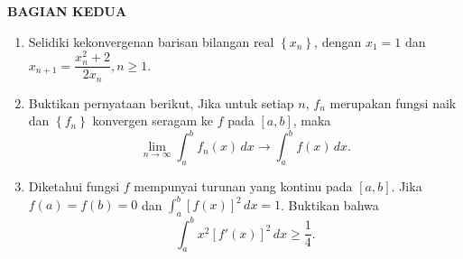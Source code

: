 \documentclass[12pt,twoside]{article}
\begin{document}
\newpage \textbf{BAGIAN KEDUA}
\begin{enumerate}
	\item Selidiki kekonvergenan barisan bilangan real $\left\lbrace x_n \right\rbrace$, dengan $x_1 = 1$ dan $x_{n+1} = \dfrac{x^2_n + 2}{2x_n}, n \geq 1.$

	\item Buktikan pernyataan berikut, Jika untuk setiap $n$, $f_n$ merupakan fungsi naik dan $\left\lbrace f_n \right\rbrace$ konvergen seragam ke $f$ pada $[a,b]$, maka
	      \begin{equation*}
		      \displaystyle\lim_{n \to \infty} \int_{a}^{b} f_n(x)\,dx \to \int_{a}^{b} f(x)\,dx.
	      \end{equation*}

	\item Diketahui fungsi $f$ mempunyai turunan yang kontinu pada $[a,b]$. Jika $f(a)=f(b)=0$ dan $\int_{a}^{b} \left[f(x)\right]^2\,dx = 1$. Buktikan bahwa
	      \begin{equation*}
		      \displaystyle\int_{a}^{b} x^2 [f'(x)]^2\, dx \geq \dfrac{1}{4}.
	      \end{equation*}
\end{enumerate}

\pagebreak
\end{document}
